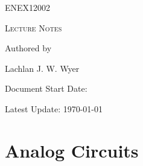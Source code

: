 \documentclass[a5paper]{article}
\date{2\textsuperscript{nd} of July 2026}
\begin{document}
	\begin{titlepage}
		\centering
		{\Huge \textsc{ENEX12002}\par}
		\vspace{1cm}
		{\Large \textsc{Lecture Notes}\par}
		\vspace{2.5cm}
		\vfill
		Authored by\par
		Lachlan J. W. Wyer
		\vfill
		\makeatletter
		{\large Document Start Date: \@date \par}
		\makeatother
		{\large Latest Update: \today\par}
	\end{titlepage}
	\tableofcontents
	\pagebreak

	\section{Analog Circuits}
\end{document}

